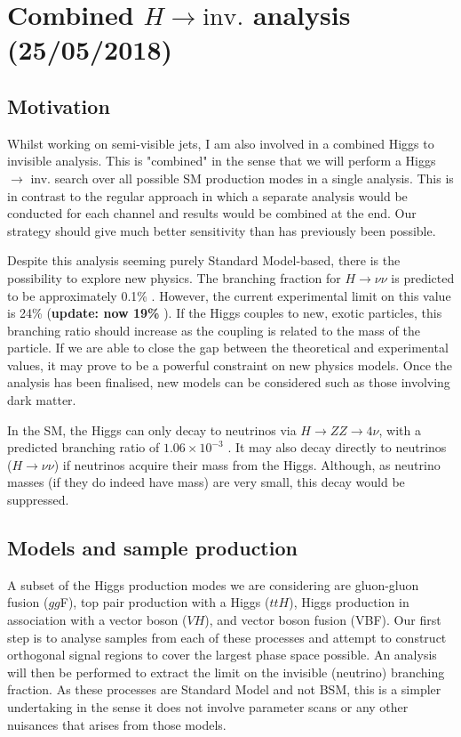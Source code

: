 \newpage
\section{Combined \texorpdfstring{$H \rightarrow \mathrm{inv.}$}{Higgs to invisible} analysis (25/05/2018)}

\subsection{Motivation}

Whilst working on semi-visible jets, I am also involved in a combined Higgs to invisible analysis. This is "combined" in the sense that we will perform a Higgs $\rightarrow$ inv. search over all possible SM production modes in a single analysis. This is in contrast to the regular approach in which a separate analysis would be conducted for each channel and results would be combined at the end. Our strategy should give much better sensitivity than has previously been possible.

Despite this analysis seeming purely Standard Model-based, there is the possibility to explore new physics. The branching fraction for $H \rightarrow \nu\nu$ is predicted to be approximately 0.1\% \cite{Heinemeyer:1559921}. However, the current experimental limit on this value is 24\% \cite{Khachatryan:2016whc} (\textbf{update: now 19\%} \cite{Sirunyan:2018owy}). If the Higgs couples to new, exotic particles, this branching ratio should increase as the coupling is related to the mass of the particle. If we are able to close the gap between the theoretical and experimental values, it may prove to be a powerful constraint on new physics models. Once the analysis has been finalised, new models can be considered such as those involving dark matter.

In the SM, the Higgs can only decay to neutrinos via $H \rightarrow ZZ \rightarrow 4\nu$, with a predicted branching ratio of $1.06 \times 10^{-3}$ \cite{Heinemeyer:1559921}. It may also decay directly to neutrinos ($H \rightarrow \nu\nu$) if neutrinos acquire their mass from the Higgs. Although, as neutrino masses (if they do indeed have mass) are very small, this decay would be suppressed.


\subsection{Models and sample production}

A subset of the Higgs production modes we are considering are gluon-gluon fusion ($gg$F), top pair production with a Higgs ($ttH$), Higgs production in association with a vector boson ($VH$), and vector boson fusion (VBF). Our first step is to analyse samples from each of these processes and attempt to construct orthogonal signal regions to cover the largest phase space possible. An analysis will then be performed to extract the limit on the invisible (neutrino) branching fraction. As these processes are Standard Model and not BSM, this is a simpler undertaking in the sense it does not involve parameter scans or any other nuisances that arises from those models.

